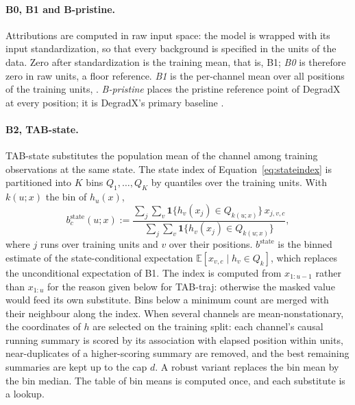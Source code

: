 \documentclass{article}
\begin{document}
\paragraph{B0, B1 and B-pristine.} Attributions are computed in raw input space: the model is wrapped with its input standardization, so that every background is specified in the units of the data. Zero after standardization is the training mean, that is, B1; \emph{B0} is therefore zero in raw units, a floor reference. \emph{B1} is the per-channel mean over all positions of the training units, . \emph{B-pristine} places the pristine reference point of DegradX at every position; it is DegradX's primary baseline \citep{degradx2026}.

\paragraph{B2, TAB-state.} TAB-state substitutes the population mean of the channel among training observations at the same state. The state index of Equation~\eqref{eq:stateindex} is partitioned into $K$ bins $Q_1,\dots,Q_K$ by quantiles over the training units. With $k(u;x)$ the bin of $h_u(x)$,
\begin{equation}\label{eq:tabstate}
b^{\mathrm{state}}_c(u;x) := \frac{\sum_{j}\sum_{v}\mathbf{1}\{h_v(x_j)\in Q_{k(u;x)}\}\,x_{j,v,c}}{\sum_{j}\sum_{v}\mathbf{1}\{h_v(x_j)\in Q_{k(u;x)}\}},
\end{equation}
where $j$ runs over training units and $v$ over their positions. $b^{\mathrm{state}}$ is the binned estimate of the state-conditional expectation $\mathbb{E}[x_{v,c}\mid h_v\in Q_k]$, which replaces the unconditional expectation of B1. The index is computed from $x_{1:u-1}$ rather than $x_{1:u}$ for the reason given below for TAB-traj: otherwise the masked value would feed its own substitute. Bins below a minimum count are merged with their neighbour along the index. When several channels are mean-nonstationary, the coordinates of $h$ are selected on the training split: each channel's causal running summary is scored by its association with elapsed position within units, near-duplicates of a higher-scoring summary are removed, and the best remaining summaries are kept up to the cap $d$. A robust variant replaces the bin mean by the bin median. The table of bin means is computed once, and each substitute is a lookup.
\end{document}
